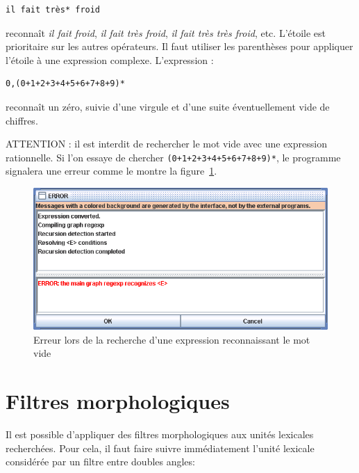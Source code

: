 \begin{verbatim}
il fait très* froid
\end{verbatim}

\noindent reconnaît \textit{il fait froid}, \textit{il fait très froid},
\textit{il fait très très froid}, etc. L’étoile est prioritaire sur les
autres opérateurs. Il faut utiliser les parenthèses pour appliquer l’étoile à une expression
complexe. L’expression :


\begin{verbatim}
0,(0+1+2+3+4+5+6+7+8+9)*
\end{verbatim}

\noindent reconnaît un zéro, suivie d’une virgule et d’une suite éventuellement vide de chiffres.

\bigskip
\noindent ATTENTION : il est interdit de rechercher le mot vide avec une expression rationnelle.
Si l’on essaye de chercher \verb$(0+1+2+3+4+5+6+7+8+9)*$, le programme signalera une erreur
comme le montre la figure~\ref{fig-epsilon-error}.


\bigskip
\begin{figure}[!ht]
\begin{center}
\includegraphics[width=14cm]{resources/img/fig4-3.png}
\caption{Erreur lors de la recherche d’une expression reconnaissant le mot vide \label{fig-epsilon-error}}
\end{center}
\end{figure}


\section{Filtres morphologiques}
\label{section-filters}

Il est possible d’appliquer des filtres morphologiques aux unités lexicales recherchées.
Pour cela, il faut faire suivre immédiatement l’unité lexicale considérée par un filtre entre
doubles angles:


